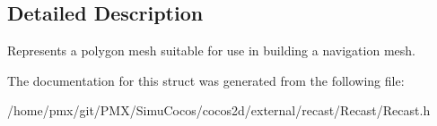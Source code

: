 \subsection{Detailed Description}
Represents a polygon mesh suitable for use in building a navigation mesh. 

The documentation for this struct was generated from the following file\+:\begin{DoxyCompactItemize}
\item 
/home/pmx/git/\+P\+M\+X/\+Simu\+Cocos/cocos2d/external/recast/\+Recast/Recast.\+h\end{DoxyCompactItemize}
